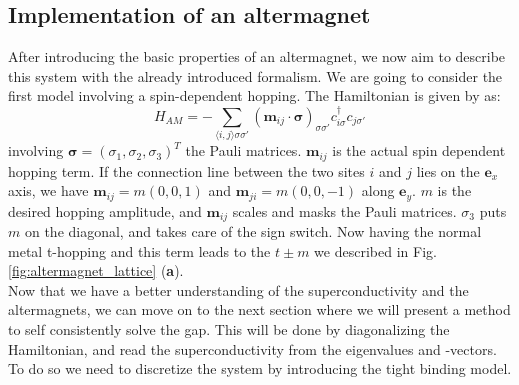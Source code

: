 \documentclass[../main.tex]{main.tex}
\begin{document}
\subsection{Implementation of an altermagnet}
After introducing the basic properties of an altermagnet, we now aim to describe this system with the already introduced formalism.
We are going to consider the first model involving a spin-dependent hopping. The Hamiltonian is given by \cite{Ouassou2023} as:
\begin{equation*}
    H_{AM} = -\sum_{\langle i, j\rangle\sigma\sigma'} \left(\bm{m}_{ij} \cdot \bm{\sigma}\right)_{\sigma\sigma'} c_{i\sigma}^{\dagger} c_{j\sigma'} 
\end{equation*}
involving $\bm{\sigma}=(\sigma_1, \sigma_2,\sigma_3)^T$ the Pauli matrices. $\bm{m}_{ij}$ is the actual spin dependent hopping term. If the connection line 
between the two sites $i$ and $j$ lies on the $\bm{e}_x$ axis, we have $\bm{m}_{ij} = m(0,0,1)$ and $\bm{m}_{ji} = m(0,0,-1)$ along $\bm{e}_y$. $m$ is 
the desired hopping amplitude, and $\bm{m}_{ij}$ scales and masks the Pauli matrices. $\sigma_3$ puts $m$ on the diagonal, and takes care of the sign switch. 
Now having the normal metal t-hopping and this term leads to the $t\pm m$ we
described in Fig. \ref{fig:altermagnet_lattice} (\textbf{a}).\\

Now that we have a better understanding of the superconductivity and the altermagnets, we can move on to the next section where we will present a method to self consistently solve
the gap. This will be done by diagonalizing the Hamiltonian, and read the superconductivity from the eigenvalues and -vectors. To do so we need to discretize the
system by introducing the tight binding model.
\end{document}
